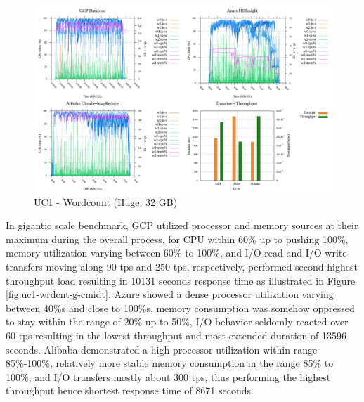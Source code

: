 \documentclass[review]{elsarticle}
\begin{document}
\begin{figure}[p]
	\caption{UC1 - Wordcount (Huge; 32 GB)}
	\label{fig:uc1-wrdcnt-h-cmidt}
	\includegraphics[width=\textwidth]{uc1-wrdcnt-h-cmidt}
	\centering
\end{figure}

In gigantic scale benchmark, GCP utilized processor and memory sources at their maximum during the overall process, for CPU within 60\% up to pushing 100\%, memory utilization varying between 60\% to 100\%, and I/O-read and I/O-write transfers moving along 90 tps and 250 tps, respectively, performed second-highest throughput load resulting in 10131 seconds response time as illustrated in Figure \ref{fig:uc1-wrdcnt-g-cmidt}. Azure showed a dense processor utilization varying between 40\%s and close to 100\%s, memory consumption was somehow oppressed to stay within the range of 20\% up to 50\%, I/O behavior seldomly reacted over 60 tps resulting in the lowest throughput and most extended duration of 13596 seconds. Alibaba demonstrated a high processor utilization within range 85\%-100\%, relatively more stable memory consumption in the range 85\% to 100\%, and I/O transfers mostly about 300 tps, thus performing the highest throughput hence shortest response time of 8671 seconds.
\end{document}
